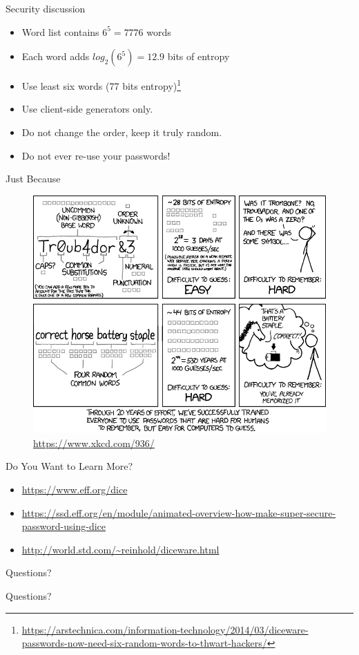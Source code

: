 \documentclass{beamer}
\begin{document}
\begin{frame}{Security discussion}
    \begin{itemize}
        \item Word list contains $6^5 = 7776$ words
        \item Each word adds $log_2(6^5) = 12.9$ bits of entropy
        \item Use least six words (77 bits entropy)\footnote{\url{https://arstechnica.com/information-technology/2014/03/diceware-passwords-now-need-six-random-words-to-thwart-hackers/}}
        \item Use client-side generators only.
        \item Do not change the order, keep it truly random.
        \item Do not ever re-use your passwords!
    \end{itemize}
\end{frame}

\begin{frame}{Just Because}
    \begin{figure}
        \includegraphics[scale=0.3]{password_strength.png}
        \caption{\url{https://www.xkcd.com/936/}}
    \end{figure}
\end{frame}

\begin{frame}{Do You Want to Learn More?}
    \begin{itemize}
        \item \url{https://www.eff.org/dice}
        \item \url{https://ssd.eff.org/en/module/animated-overview-how-make-super-secure-password-using-dice}
        \item \url{http://world.std.com/~reinhold/diceware.html}
    \end{itemize}
\end{frame}

\begin{frame}{Questions?}
    \begin{center}
    Questions?
    \end{center}
\end{frame}
\end{document}
